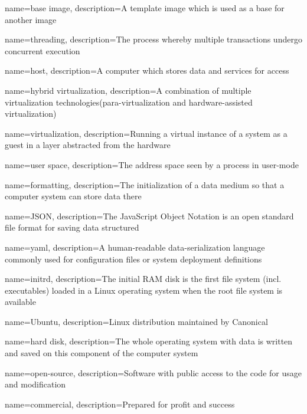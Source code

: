 {
    name={base image},
    description={A template image which is used as a base for another image}
}

{
    name={threading},
    description={The process whereby multiple transactions undergo concurrent execution}
}

{
    name={host},
    description={A computer which stores data and services for access}
}

{
    name={hybrid virtualization},
    description={A combination of multiple virtualization technologies(para-virtualization and hardware-assisted virtualization)}
}

{
    name={virtualization},
    description={Running a virtual instance of a system as a guest in a layer abstracted from the hardware}
}

{
    name={user space},
    description={The address space seen by a process in user-mode}
}


{
    name={formatting},
    description={The initialization of a data medium so that a computer system can store data there}
}

{
    name={JSON},
    description={The JavaScript Object Notation is an open standard file format for saving data structured}
}

{
    name={yaml},
    description={A human-readable data-serialization language commonly used for configuration files or system deployment definitions}
}

{
    name={initrd},
    description={The initial RAM disk is the first file system (incl. executables) loaded in a Linux operating system when the root file system is available}
}

{
    name={Ubuntu},
    description={Linux distribution maintained by Canonical}
}

{
    name={hard disk},
    description={The whole operating system with data is written and saved on this component of the computer system}
}

{
    name={open-source},
    description={Software with public access to the code for usage and modification}
}

{
    name={commercial},
    description={Prepared for profit and success}
}

